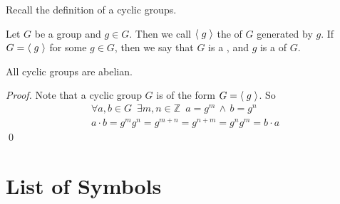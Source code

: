 \documentclass[notoc,notitlepage]{tufte-book}
\begin{document}
Recall the definition of a cyclic groups.

\begin{defn*}
  Let $G$ be a group and $g \in G$. Then we call $\langle \; g \; \rangle$ the  of $G$ generated by $g$. If $G = \langle \; g \; \rangle$ for some $g \in G$, then we say that $G$ is a , and $g$ is a  of $G$.
\end{defn*}

\begin{propo}
\label{propo:cyclic_groups_are_abelian}
  All cyclic groups are abelian.
\end{propo}

\begin{proof}
  Note that a cyclic group $G$ is of the form $G = \langle \; g \; \rangle$. So
  \begin{gather*}
    \forall a, b \in G \enspace \exists m, n \in \mathbb{Z} \enspace a = g^m \, \land \, b = g^n \\
    a \cdot b = g^m g^n = g^{m + n} = g^{n + m} = g^n g^m = b \cdot a
  \end{gather*}\qed
\end{proof}




\nobibliography*


\printindex

\chapter{List of Symbols}
\end{document}
